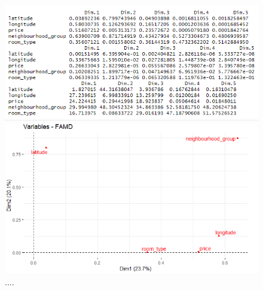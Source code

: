 \documentclass{FR16}
\begin{document}
\begin{figure}[!htb]
   \begin{minipage}{0.48\textwidth}
     \centering
    \includegraphics[width=1\textwidth]{figures/FAMD5.PNG} 
 \caption{\label{fig:33} ...}
   \end{minipage}\hfill
   \begin{minipage}{0.48\textwidth}
     \centering
       \includegraphics[width=1\textwidth]{figures/FAMD6.PNG} 
 \caption{\label{fig:34} .... }
   \end{minipage}
   
\end{figure}
\end{document}
